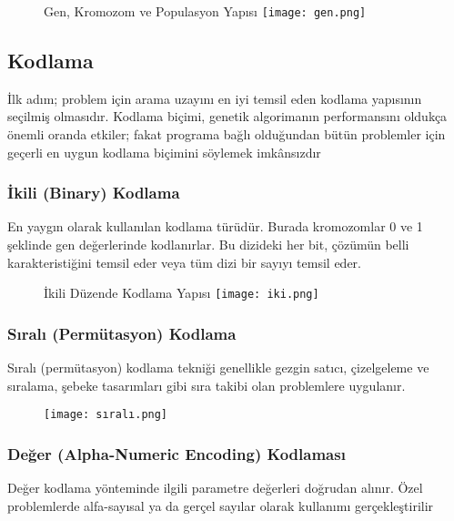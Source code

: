 \documentclass[12pt, a4paper]{article}
\begin{document}
\begin{flushleft}
	
	
	\begin{figure}[h]
		\item {Gen, Kromozom ve Populasyon Yapısı}
		\centering
		\texttt{[image: gen.png]}
		\\[20pt]
	\end{figure}
	
	\subsection{Kodlama}
	İlk adım; problem için arama uzayını en iyi temsil eden kodlama yapısının 
	seçilmiş olmasıdır. Kodlama biçimi, genetik algorimanın performansını oldukça önemli oranda etkiler; fakat programa bağlı olduğundan bütün problemler için geçerli en uygun kodlama biçimini söylemek imkânsızdır\\[5pt]
	\subsubsection{İkili (Binary) Kodlama}
	En yaygın olarak kullanılan kodlama türüdür. Burada kromozomlar 0 ve 1 
	şeklinde gen değerlerinde kodlanırlar. Bu dizideki her bit, çözümün belli
	karakteristiğini temsil eder veya tüm dizi bir sayıyı temsil eder. 
	
		\begin{figure}[h]
		\item { İkili Düzende Kodlama Yapısı}
		\centering
		\texttt{[image: iki.png]}
		
	\end{figure}
	
	\subsubsection{ Sıralı (Permütasyon) Kodlama}
	Sıralı (permütasyon) kodlama tekniği genellikle gezgin satıcı, çizelgeleme ve 
	sıralama, şebeke tasarımları gibi sıra takibi olan problemlere uygulanır.
	
	\begin{figure}[h]
		
		\centering
		\texttt{[image: sıralı.png]}
		
	\end{figure}
	
	\subsubsection{Değer (Alpha-Numeric Encoding) Kodlaması}
	Değer kodlama yönteminde ilgili parametre değerleri doğrudan alınır. Özel
	problemlerde alfa-sayısal ya da gerçel sayılar olarak kullanımı gerçekleştirilir
	

\end{flushleft}
\end{document}
